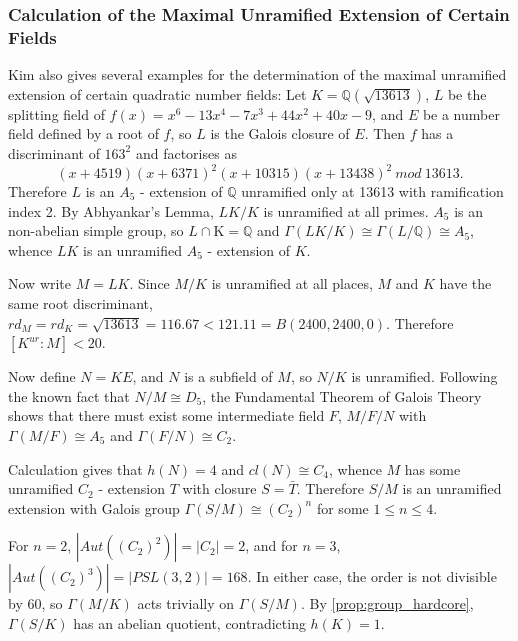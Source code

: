 \documentclass[12pt]{extarticle}
\newcommand{\Q}{\mathbb{Q}}
\newcommand{\<}{\langle}
\renewcommand{\>}{\rangle}
\theoremstyle{definition}
\begin{document}
 \subsubsection*{Calculation of the Maximal Unramified Extension of Certain Fields}
 Kim also gives several examples for the determination of the maximal unramified extension of certain quadratic number fields: 
Let $K= \Q(\sqrt{13613})$, $L$ be the splitting field of $f(x)=x^6-13x^4-7x^3 +44x^2 +40x-9$, and $E$ be a number field defined by a root of $f$, so $L$ is the Galois closure of $E$. Then $f$ has a discriminant of $163^2$ and factorises as
\begin{equation}
(x+4519)(x+6371)^2(x+10315)(x+13438)^2 \: mod \: 13613.
\end{equation}
Therefore $L$ is an $A_5$ - extension of $\Q$ unramified only at 13613 with ramification index 2. By Abhyankar's Lemma, $LK/K$ is unramified at all primes. $A_5$ is an non-abelian simple group, so $L \cap $K$ = \Q$ and $\Gamma(LK/K) \cong \Gamma(L/\Q) \cong A_5$, whence $LK$ is an unramified $A_5$ - extension of $K$. \par
Now write $M=LK$. Since $M/K$ is unramified at all places, $M$ and $K$ have the same root discriminant, $rd_M = rd_K = \sqrt{13613} = 116.67 < 121.11 = B(2400,2400,0)$. Therefore $[K^{ur}:M]<20$. \\ \par
Now define $N=KE$, and $N$ is a subfield of $M$, so $N/K$ is unramified. Following the known fact that $N/M \cong D_5$, the Fundamental Theorem of Galois Theory shows that there must exist some intermediate field $F$, $M/F/N$ with $\Gamma(M/F) \cong A_5$ and $\Gamma(F/N) \cong C_2$. \par
 Calculation gives that $h(N)=4$ and $cl(N) \cong C_4$, whence $M$ has some unramified $C_2$ - extension $T$ with closure $S = \bar{T}$. Therefore $S/M$ is an unramified extension with Galois group $\Gamma(S/M) \cong \left(C_2 \right)^{n}$ for some $1 \leq n \leq 4$. \\ \par
For $n=2$, $|Aut((C_2)^2)| = |C_2| = 2$, and for $n=3$, $|Aut((C_2)^3)| = |PSL(3,2)| = 168$. In either case, the order is not divisible by 60, so $\Gamma(M/K)$ acts trivially on $\Gamma(S/M)$. By \cref{prop:group_hardcore}, $\Gamma(S/K)$ has an abelian quotient, contradicting $h(K)=1$.\\ \par
\end{document}
